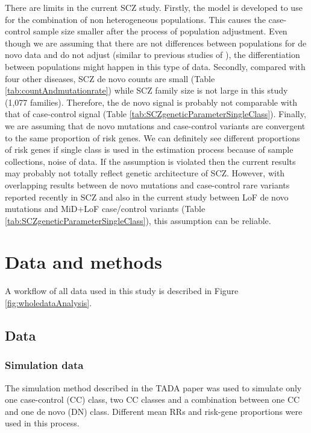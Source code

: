 \documentclass[]{article}
\begin{document}
There are limits in the current SCZ study. Firstly, the model is
developed to use for the combination of non heterogeneous populations. This causes the case-control
sample size smaller after the process of population adjustment. Even
though we are assuming that there are not differences between populations
for de novo data and do not adjust (similar to previous studies
of \cite{de2014synaptic, he2013integrated, singh2016rare}), the
differentiation between populations might happen in this type of
data. Secondly, compared with four other diseases, SCZ de novo counts
are small (Table \ref{tab:countAndmutationrate}) while SCZ family
size is not large in this study (1,077 families). Therefore, the de novo signal is probably not
comparable with that of case-control signal (Table
\ref{tab:SCZgeneticParameterSingleClass}). Finally, we are assuming
that de novo mutations and case-control variants are convergent to the
same proportion of risk genes. We can definitely see different
proportions of risk genes if single class is used in the estimation
process because of sample collections, noise of data. If the
assumption is violated then the current results may probably not
totally reflect genetic architecture of SCZ. However, with overlapping
results between de novo mutations and case-control rare variants
reported recently in SCZ
\citep{purcell2014polygenic,fromer2014novo,genovese2016increased,singh2016rare}
and also in the current study between LoF de novo mutations and MiD+LoF
case/control variants (Table \ref{tab:SCZgeneticParameterSingleClass}), this assumption can be reliable.






\section{Data and methods}

A workflow of all data used in this study is described in Figure \ref{fig:wholedataAnalysis}.

\subsection{Data}

\subsubsection{Simulation data}

The simulation method described in the TADA paper
\citep{he2013integrated} was used to simulate only one case-control
(CC) class, two CC classes and  a combination between one CC and one de novo (DN) class. Different mean RRs and
risk-gene proportions were used in this process.
\end{document}
